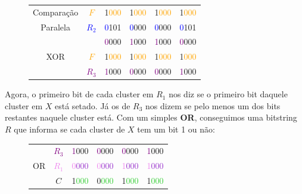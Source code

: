 \begin{figure}[h]
\bf \Large \centering
\begin{tabular}{cccccc}
\large{Comparação} & \textcolor{orange}{$F$} &
\textcolor{RawSienna}{1}\textcolor{orange}{000} &
\textcolor{RawSienna}{1}\textcolor{orange}{000} &
\textcolor{RawSienna}{1}\textcolor{orange}{000} &
\textcolor{RawSienna}{1}\textcolor{orange}{000} \\
\large{Paralela} & \textcolor{blue}{$R_2$} &
\textcolor{blue}{0}\textcolor{PineGreen}{101} &
\textcolor{blue}{0}\textcolor{PineGreen}{000} &
\textcolor{blue}{0}\textcolor{PineGreen}{000} &
\textcolor{blue}{0}\textcolor{PineGreen}{101} \\
\hline
& &
\textcolor{Purple}{0}\textcolor{CarnationPink}{000} &
\textcolor{Purple}{1}\textcolor{CarnationPink}{000} &
\textcolor{Purple}{1}\textcolor{CarnationPink}{000} &
\textcolor{Purple}{0}\textcolor{CarnationPink}{000} \\
\large{XOR} & \textcolor{orange}{$F$} &
\textcolor{RawSienna}{1}\textcolor{orange}{000} &
\textcolor{RawSienna}{1}\textcolor{orange}{000} &
\textcolor{RawSienna}{1}\textcolor{orange}{000} &
\textcolor{RawSienna}{1}\textcolor{orange}{000} \\
\hline
& \textcolor{Purple}{$R_3$} &
\textcolor{Purple}{1}\textcolor{CarnationPink}{000} &
\textcolor{Purple}{0}\textcolor{CarnationPink}{000} &
\textcolor{Purple}{0}\textcolor{CarnationPink}{000} &
\textcolor{Purple}{1}\textcolor{CarnationPink}{000} \\
\end{tabular}
\end{figure}

Agora, o primeiro bit de cada cluster em $R_1$ nos diz se o primeiro bit daquele
cluster em $X$ está setado. Já os de $R_3$ nos dizem se pelo menos um dos bits
restantes naquele cluster está. Com um simples \textbf{OR}, conseguimos uma
bitstring $R$ que informa se cada cluster de $X$ tem um bit 1 ou não:

\begin{figure}[h]
\bf \Large \centering
\begin{tabular}{cccccc}
& \textcolor{Purple}{$R_3$} &
\textcolor{Purple}{1}\textcolor{CarnationPink}{000} &
\textcolor{Purple}{0}\textcolor{CarnationPink}{000} &
\textcolor{Purple}{0}\textcolor{CarnationPink}{000} &
\textcolor{Purple}{1}\textcolor{CarnationPink}{000} \\
\large{OR} & \textcolor{Violet}{$R_1$} &
\textcolor{Violet}{0}\textcolor{DarkOrchid}{000} &
\textcolor{Violet}{0}\textcolor{DarkOrchid}{000} &
\textcolor{Violet}{1}\textcolor{DarkOrchid}{000} &
\textcolor{Violet}{1}\textcolor{DarkOrchid}{000} \\
\hline
& \textcolor{PineGreen}{$C$} & 
\textcolor{PineGreen}{1}\textcolor{LimeGreen}{000} &
\textcolor{PineGreen}{0}\textcolor{LimeGreen}{000} &
\textcolor{PineGreen}{1}\textcolor{LimeGreen}{000} &
\textcolor{PineGreen}{1}\textcolor{LimeGreen}{000} 
\end{tabular}
\end{figure}

